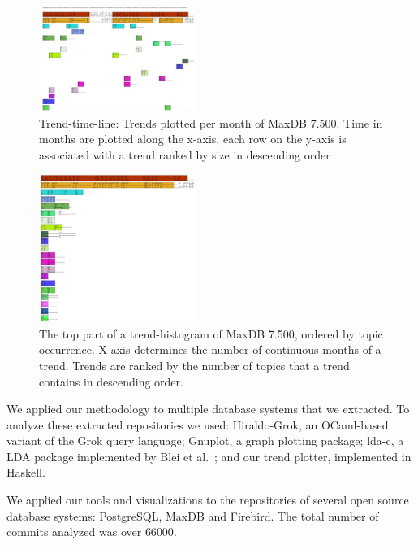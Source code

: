 \documentclass[times, 10pt,twocolumn]{article}
\newcommand{\hla}[1]{{\color{changecolor2} #1 }}
\newcommand{\shrinkit}{\vspace*{-.3em}}
\begin{document}
\begin{figure}
  \centering
  \includegraphics[width=0.45\textwidth]{class-smear-plot-crop-scaled}
  \caption{Trend-time-line: Trends plotted per month of MaxDB 7.500. Time in months are plotted along the x-axis, each row on the y-axis is associated with a trend ranked by size in descending order}         
  \label{fig:trendtimeline}
\end{figure}


\begin{figure}
  \centering
  \includegraphics[width=0.45\textwidth]{histogram-cropped-scaled}
  \caption{The top part of a trend-histogram of MaxDB 7.500, ordered
    by topic occurrence. X-axis determines the number of continuous
    months of a trend. Trends are ranked by the number of topics that
    a trend contains in descending order.}
  \label{fig:histogram}
\end{figure}



\shrinkit
{}
\shrinkit

We applied our methodology to multiple database systems that we
extracted.  To analyze these extracted repositories we used:
Hiraldo-Grok, an OCaml-based variant of the Grok query language;
Gnuplot, a graph plotting package; lda-c, a LDA package implemented by
Blei et al.~\cite{944937}; and our trend plotter, implemented in
Haskell.

We applied our tools and visualizations to the repositories of several
\hla{
open source database systems: PostgreSQL, MaxDB and Firebird. The
total number of commits analyzed was over $66 000$.
}
\end{document}
